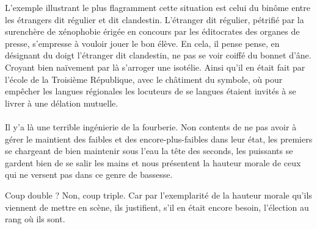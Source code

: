 L’exemple illustrant le plus flagramment cette situation est celui du binôme entre les étrangers dit régulier et dit clandestin. L’étranger dit régulier, pétrifié par la surenchère de xénophobie érigée en concours par les éditocrates des organes de presse, s’empresse à vouloir jouer le bon élève. En cela, il pense pense, en désignant du doigt l’étranger dit clandestin, ne pas se voir coiffé du bonnet d’âne. Croyant bien naïvement par là s’arroger une isotélie. Ainsi qu’il en était fait par l’école de la Troisième République, avec le châtiment du symbole, où pour empêcher les langues régionales les locuteurs de se langues étaient invités à se livrer à une délation mutuelle.

\paragraph{}
Il y’a là une terrible ingénierie de la fourberie. Non contents de ne pas avoir à gérer le maintient des faibles et des encore-plus-faibles dans leur état, les premiers se chargeant de bien maintenir sous l’eau la tête des seconds, les puissants se gardent bien de se salir les mains et nous présentent la hauteur morale de ceux qui ne versent pas dans ce genre de bassesse.

Coup double ? Non, coup triple. Car par l’exemplarité de la hauteur morale qu’ils viennent de mettre en scène, ils justifient, s’il en était encore besoin, l’élection au rang où ils sont.



